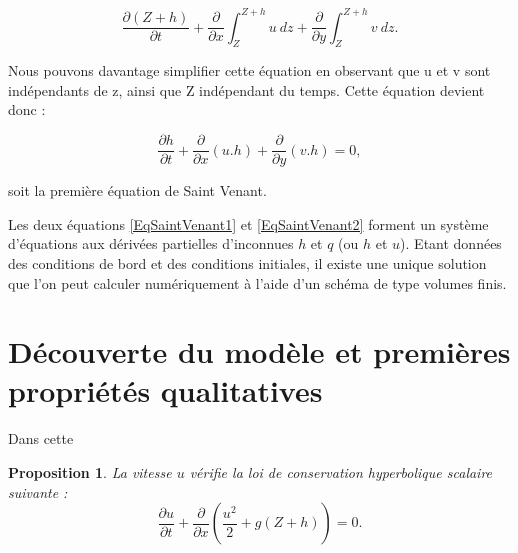 \documentclass[
11pt, %
francais, %
singlespacing, %
headsepline, %
f%
]{MastersDoctoralThesis} %
\newtheorem{prop}{Proposition}
\theoremstyle{definition}
\begin{document}
\begin{equation}
\frac{\partial (Z+h)}{\partial t} + \frac{\partial}{\partial x} \int_{Z}^{Z+h} u \ dz +  \frac{\partial}{\partial y} \int_{Z}^{Z+h} v \ dz.
\end{equation}

Nous pouvons davantage simplifier cette équation en observant que u et v sont indépendants de z, ainsi que Z indépendant du temps. Cette équation devient donc :

\begin{equation}
\frac{\partial h}{\partial t} + \frac{\partial}{\partial x} (u . h ) + \frac{\partial}{\partial y} (v . h )=0,\label{EqSaintVenant1}
\end{equation}

soit la première équation de Saint Venant.

Les deux équations \ref{EqSaintVenant1} et \ref{EqSaintVenant2} forment un système d'équations aux dérivées partielles d'inconnues $h$ et $q$ (ou $h$ et $u$). Etant données des conditions de bord et des conditions initiales, il existe une unique solution que l'on peut calculer numériquement à l'aide d'un schéma de type volumes finis.

\section{Découverte du modèle et premières propriétés qualitatives}

Dans cette

\begin{prop} La vitesse $u$ vérifie la loi de conservation hyperbolique scalaire suivante : 
\begin{equation}
\frac{\partial u}{\partial t}+\frac{\partial}{\partial x}(\frac{u^{2}}{2}+g(Z+h))=0. \label{cl}
\end{equation}

\end{prop}
\end{document}
